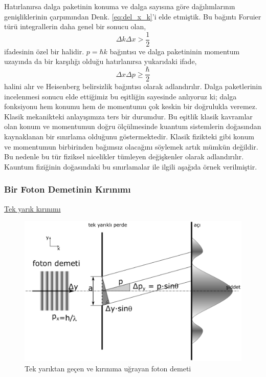 \documentclass[a4paper,12pt, twoside]{article}
\begin{document}
Hatırlanırsa dalga paketinin konuma ve dalga sayısına göre dağılımlarının genişliklerinin çarpımından Denk. \ref{eq:del_x_k}'i elde etmiştik. Bu bağıntı Foruier türü integrallerin daha genel bir sonucu olan,
\begin{equation}
\Delta k\Delta x >\dfrac {1}{2}
\end{equation}
ifadesinin özel bir halidir. $p = \hbar k$ bağıntısı ve dalga paketininin momentum uzayında da bir karşılığı olduğu hatırlanırsa yukarıdaki ifade,
\begin{equation}
\Delta x \Delta p \geq\dfrac {\hbar}{2}
\label{eq:heisenberg_uncertainty}
\end{equation}
halini alır ve Heisenberg belirsizlik bağıntısı olarak adlandırılır. Dalga paketlerinin incelenmesi sonucu elde ettiğimiz bu eşitliğin sayesinde anlıyoruz ki; dalga fonksiyonu hem konumu hem de momentumu çok keskin bir doğrulukla veremez. Klasik mekanikteki anlayışımıza ters bir durumdur. Bu eşitlik klasik kavramlar olan konum ve momentumun doğru ölçülmesinde kuantum sistemlerin doğasından kaynaklanan bir sınırlama olduğunu göstermektedir. Klasik fizikteki gibi konum ve momentumun birbirinden bağımsız olacağını söylemek artık mümkün değildir. Bu nedenle bu tür fiziksel nicelikler tümleyen değişkenler olarak adlandırılır.  Kauntum fiziğinin doğasındaki bu sınırlamalar ile ilgili aşağıda örnek verilmiştir.  

\subsubsection{Bir Foton Demetinin Kırınımı}

\href{https://opentextbc.ca/physicstestbook2/chapter/single-slit-diffraction/}{Tek yarık kırınımı}

\begin{figure}[hbtp]
	\centering
	\includegraphics[width=0.7\linewidth]{figurler/tek_yarik_deneyi.eps}
	\caption{Tek yarıktan geçen ve kırınıma uğrayan foton demeti}
	\label{fig:tekyarikdeneyi}
\end{figure}
\end{document}
